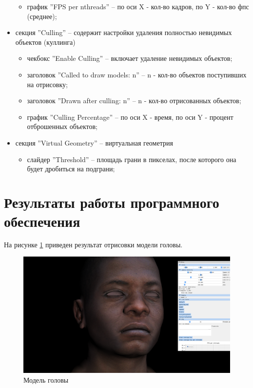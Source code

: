 \begin{itemize}
\begin{itemize}
			\item график ''FPS per nthreads'' -- по оси X - кол-во кадров, по Y - кол-во фпс (среднее);
		 \end{itemize}
	\item секция ''Culling'' -- содержит настройки удаления полностью невидимых объектов (куллинга)
		 \begin{itemize}
			\item чекбокс ''Enable Culling'' -- включает удаление невидимых объектов;
			\item заголовок ''Called to draw models: n'' -- n - кол-во объектов поступивших на отрисовку;
			\item заголовок ''Drawn after culling: n'' -- n - кол-во отрисованных объектов;
			\item график ''Culling Percentage'' -- по оси X - время, по оси Y - процент отброшенных объектов;
		 \end{itemize}
	\item секция ''Virtual Geometry'' -- виртуальная геометрия
		 \begin{itemize}
			\item слайдер ''Threshold'' -- площадь грани в пикселах, после которого она будет дробиться на подграни;
		 \end{itemize}
\end{itemize}

\section{Результаты работы программного обеспечения}

На рисунке \ref{img:t1} приведен результат отрисовки модели головы.

\begin{figure}[H]
	\begin{center}
		\includegraphics[scale=0.3]{img/i1.png}
	\end{center}
	\captionsetup{justification=centering}
	\caption{Модель головы}
	\label{img:t1}
\end{figure}

